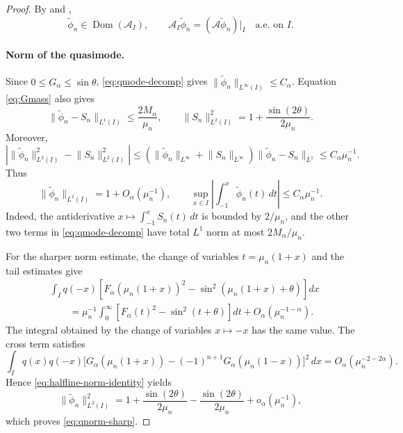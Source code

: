 \documentclass[11pt]{amsart}
\numberwithin{equation}{section}
\theoremstyle{remark}
\newcommand{\wt}{\widetilde}
\newcommand{\norm}[2][]{\lVert #2\rVert_{#1}}
\newcommand{\Dom}{\operatorname{Dom}}
\begin{document}
\begin{proof}
By \cite[Lemma~1]{KwasnickiInterval} and
\cite[Lemma~3.3]{KaletaKwasnickiMalecki},
\[
 \wt\phi_n\in\Dom(\mathcal A_I),
 \qquad
 \mathcal A_I\wt\phi_n=(\mathcal A\wt\phi_n)|_I
 \quad\text{a.e. on }I.
\]

\paragraph{\textbf{Norm of the quasimode.}}
Since $0\le G_\alpha\le\sin\theta$, \eqref{eq:qmode-decomp} gives
$\norm[L^\infty(I)]{\wt\phi_n}\le C_\alpha$.  Equation
\eqref{eq:Gmass} also gives
\[
 \norm[L^1(I)]{\wt\phi_n-S_n}\le \frac{2M_\alpha}{\mu_n},
 \qquad
 \norm[L^2(I)]{S_n}^2=1+\frac{\sin(2\theta)}{2\mu_n}.
\]
Moreover,
\[
 \left|\norm[L^2(I)]{\wt\phi_n}^2-\norm[L^2(I)]{S_n}^2\right|
 \le (\norm[L^\infty]{\wt\phi_n}+\norm[L^\infty]{S_n})
 \norm[L^1]{\wt\phi_n-S_n}
 \le C_\alpha\mu_n^{-1}.
\]
Thus
\begin{equation}\label{eq:qnorm-rough}
 \norm[L^2(I)]{\wt\phi_n}=1+O_\alpha(\mu_n^{-1}),
 \qquad
 \sup_{x\in I}\left|\int_{-1}^x\wt\phi_n(t)\,dt\right|
 \le C_\alpha\mu_n^{-1}.
\end{equation}
Indeed, the antiderivative $x\mapsto\int_{-1}^xS_n(t)\,dt$ is bounded by $2/\mu_n$, and the other two
terms in \eqref{eq:qmode-decomp} have total $L^1$ norm at most
$2M_\alpha/\mu_n$.

For the sharper norm estimate, the change of variables $t=\mu_n(1+x)$ and
the tail estimates give
\[
 \begin{aligned}
 &\int_I q(-x)\left[F_\alpha(\mu_n(1+x))^2
 -\sin^2(\mu_n(1+x)+\theta)\right]dx\\
 &\qquad=\mu_n^{-1}\int_0^\infty
 \left[F_\alpha(t)^2-\sin^2(t+\theta)\right]dt
 +O_\alpha(\mu_n^{-1-\alpha}).
 \end{aligned}
\]
The integral obtained by the change of variables $x\mapsto-x$ has the same
value.  The cross term satisfies
\[
 \int_Iq(x)q(-x)\bigl[G_\alpha(\mu_n(1+x))
 -(-1)^{n+1} G_\alpha(\mu_n(1-x))\bigr]^2\,dx
 =O_\alpha(\mu_n^{-2-2\alpha}).
\]
Hence
\eqref{eq:halfline-norm-identity} yields
\[
 \norm[L^2(I)]{\wt\phi_n}^2
 =1+\frac{\sin(2\theta)}{2\mu_n}
 -\frac{\sin(2\theta)}{2\mu_n}+o_\alpha(\mu_n^{-1}),
\]
which proves \eqref{eq:qnorm-sharp}.

\medskip


\end{proof}
\end{document}
